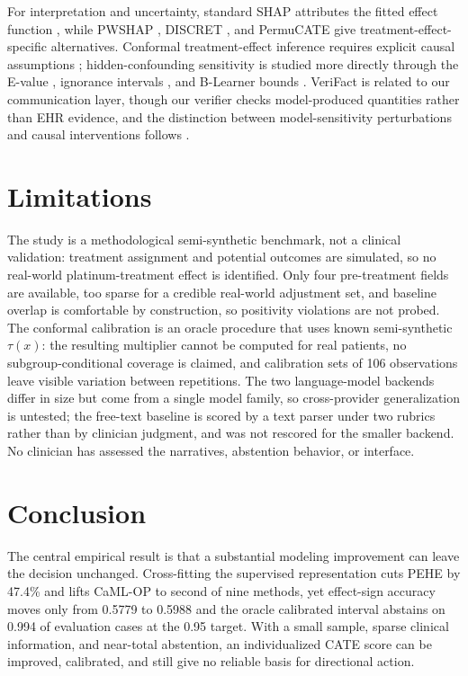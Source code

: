 \documentclass{article}
\begin{document}
For interpretation and uncertainty, standard SHAP attributes the fitted effect function \citep{lundberg2017}, while PWSHAP \citep{terminassian2023}, DISCRET \citep{wu2024}, and PermuCATE \citep{paillard2025} give treatment-effect-specific alternatives. Conformal treatment-effect inference requires explicit causal assumptions \citep{lei2020}; hidden-confounding sensitivity is studied more directly through the E-value \citep{vanderweele2017}, ignorance intervals \citep{jesson2021}, and B-Learner bounds \citep{oprescu2023}. VeriFact \citep{chung2025} is related to our communication layer, though our verifier checks model-produced quantities rather than EHR evidence, and the distinction between model-sensitivity perturbations and causal interventions follows \citet{pearl2009}.

\section{Limitations}
The study is a methodological semi-synthetic benchmark, not a clinical validation: treatment assignment and potential outcomes are simulated, so no real-world platinum-treatment effect is identified. Only four pre-treatment fields are available, too sparse for a credible real-world adjustment set, and baseline overlap is comfortable by construction, so positivity violations are not probed. The conformal calibration is an oracle procedure that uses known semi-synthetic $\tau(x)$: the resulting multiplier cannot be computed for real patients, no subgroup-conditional coverage is claimed, and calibration sets of 106 observations leave visible variation between repetitions. The two language-model backends differ in size but come from a single model family, so cross-provider generalization is untested; the free-text baseline is scored by a text parser under two rubrics rather than by clinician judgment, and was not rescored for the smaller backend. No clinician has assessed the narratives, abstention behavior, or interface.

\section{Conclusion}
The central empirical result is that a substantial modeling improvement can leave the decision unchanged. Cross-fitting the supervised representation cuts PEHE by 47.4\% and lifts CaML-OP to second of nine methods, yet effect-sign accuracy moves only from 0.5779 to 0.5988 and the oracle calibrated interval abstains on 0.994 of evaluation cases at the 0.95 target. With a small sample, sparse clinical information, and near-total abstention, an individualized CATE score can be improved, calibrated, and still give no reliable basis for directional action.
\end{document}
